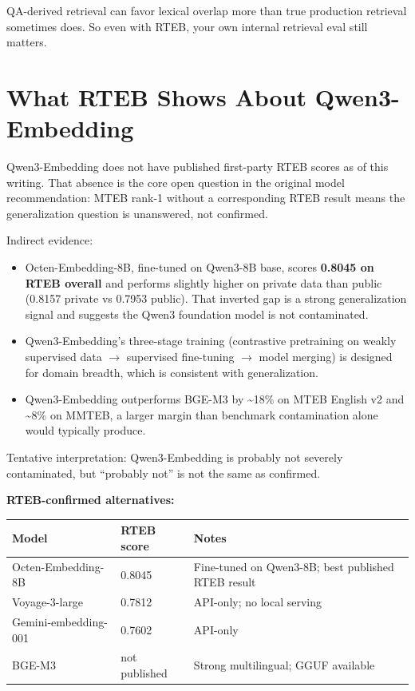 QA-derived retrieval can favor lexical overlap more than true production retrieval sometimes
does. So even with RTEB, your own internal retrieval eval still matters.

\section{What RTEB Shows About Qwen3-Embedding}

Qwen3-Embedding does not have published first-party RTEB scores as of this writing. That
absence is the core open question in the original model recommendation: MTEB rank-1 without
a corresponding RTEB result means the generalization question is unanswered, not confirmed.

Indirect evidence:

\begin{itemize}
    \item Octen-Embedding-8B, fine-tuned on Qwen3-8B base, scores \textbf{0.8045 on RTEB
          overall} and performs slightly higher on private data than public (0.8157 private
          vs 0.7953 public). That inverted gap is a strong generalization signal and suggests
          the Qwen3 foundation model is not contaminated.
    \item Qwen3-Embedding's three-stage training (contrastive pretraining on weakly supervised
          data $\to$ supervised fine-tuning $\to$ model merging) is designed for domain breadth,
          which is consistent with generalization.
    \item Qwen3-Embedding outperforms BGE-M3 by \textasciitilde18\% on MTEB English v2 and
          \textasciitilde8\% on MMTEB, a larger margin than benchmark contamination alone
          would typically produce.
\end{itemize}

Tentative interpretation: Qwen3-Embedding is probably not severely contaminated, but
``probably not'' is not the same as confirmed.

\textbf{RTEB-confirmed alternatives:}

\begin{center}
\begin{tabular}{lll}
\toprule
\textbf{Model} & \textbf{RTEB score} & \textbf{Notes} \\
\midrule
Octen-Embedding-8B & 0.8045 & Fine-tuned on Qwen3-8B; best published RTEB result \\
Voyage-3-large & 0.7812 & API-only; no local serving \\
Gemini-embedding-001 & 0.7602 & API-only \\
BGE-M3 & not published & Strong multilingual; GGUF available \\
\bottomrule
\end{tabular}
\end{center}

